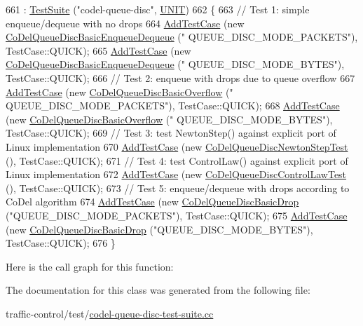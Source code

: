 \begin{DoxyCode}
661     : \hyperlink{classns3_1_1TestSuite_a904b0c40583b744d30908aeb94636d1a}{TestSuite} (\textcolor{stringliteral}{"codel-queue-disc"}, \hyperlink{classns3_1_1TestSuite_a1ebfcab34ec8161e085e8e3a1855eae0a3885375a3787abf60431f8454b3cadbd}{UNIT})
662   \{
663     \textcolor{comment}{// Test 1: simple enqueue/dequeue with no drops}
664     \hyperlink{classns3_1_1TestCase_a3718088e3eefd5d6454569d2e0ddd835}{AddTestCase} (\textcolor{keyword}{new} \hyperlink{classCoDelQueueDiscBasicEnqueueDequeue}{CoDelQueueDiscBasicEnqueueDequeue} (\textcolor{stringliteral}{"
      QUEUE\_DISC\_MODE\_PACKETS"}), TestCase::QUICK);
665     \hyperlink{classns3_1_1TestCase_a3718088e3eefd5d6454569d2e0ddd835}{AddTestCase} (\textcolor{keyword}{new} \hyperlink{classCoDelQueueDiscBasicEnqueueDequeue}{CoDelQueueDiscBasicEnqueueDequeue} (\textcolor{stringliteral}{"
      QUEUE\_DISC\_MODE\_BYTES"}), TestCase::QUICK);
666     \textcolor{comment}{// Test 2: enqueue with drops due to queue overflow}
667     \hyperlink{classns3_1_1TestCase_a3718088e3eefd5d6454569d2e0ddd835}{AddTestCase} (\textcolor{keyword}{new} \hyperlink{classCoDelQueueDiscBasicOverflow}{CoDelQueueDiscBasicOverflow} (\textcolor{stringliteral}{"
      QUEUE\_DISC\_MODE\_PACKETS"}), TestCase::QUICK);
668     \hyperlink{classns3_1_1TestCase_a3718088e3eefd5d6454569d2e0ddd835}{AddTestCase} (\textcolor{keyword}{new} \hyperlink{classCoDelQueueDiscBasicOverflow}{CoDelQueueDiscBasicOverflow} (\textcolor{stringliteral}{"
      QUEUE\_DISC\_MODE\_BYTES"}), TestCase::QUICK);
669     \textcolor{comment}{// Test 3: test NewtonStep() against explicit port of Linux implementation}
670     \hyperlink{classns3_1_1TestCase_a3718088e3eefd5d6454569d2e0ddd835}{AddTestCase} (\textcolor{keyword}{new} \hyperlink{classCoDelQueueDiscNewtonStepTest}{CoDelQueueDiscNewtonStepTest} (), 
      TestCase::QUICK);
671     \textcolor{comment}{// Test 4: test ControlLaw() against explicit port of Linux implementation}
672     \hyperlink{classns3_1_1TestCase_a3718088e3eefd5d6454569d2e0ddd835}{AddTestCase} (\textcolor{keyword}{new} \hyperlink{classCoDelQueueDiscControlLawTest}{CoDelQueueDiscControlLawTest} (), 
      TestCase::QUICK);
673     \textcolor{comment}{// Test 5: enqueue/dequeue with drops according to CoDel algorithm}
674     \hyperlink{classns3_1_1TestCase_a3718088e3eefd5d6454569d2e0ddd835}{AddTestCase} (\textcolor{keyword}{new} \hyperlink{classCoDelQueueDiscBasicDrop}{CoDelQueueDiscBasicDrop} (\textcolor{stringliteral}{"QUEUE\_DISC\_MODE\_PACKETS"}),
       TestCase::QUICK);
675     \hyperlink{classns3_1_1TestCase_a3718088e3eefd5d6454569d2e0ddd835}{AddTestCase} (\textcolor{keyword}{new} \hyperlink{classCoDelQueueDiscBasicDrop}{CoDelQueueDiscBasicDrop} (\textcolor{stringliteral}{"QUEUE\_DISC\_MODE\_BYTES"}), 
      TestCase::QUICK);
676   \}
\end{DoxyCode}


Here is the call graph for this function\+:




The documentation for this class was generated from the following file\+:\begin{DoxyCompactItemize}
\item 
traffic-\/control/test/\hyperlink{codel-queue-disc-test-suite_8cc}{codel-\/queue-\/disc-\/test-\/suite.\+cc}\end{DoxyCompactItemize}
